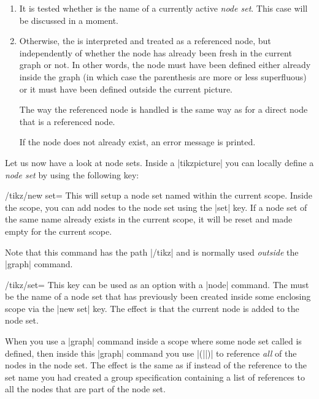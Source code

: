 \begin{enumerate}
\item It is tested whether  is the name of a currently
  active \emph{node set}. This case will be discussed in a moment.
\item Otherwise, the  is interpreted and treated as a
  referenced node, but independently of whether the node has already
  been fresh in the current graph or not. In other words, the node
  must have been defined either already inside the graph (in which
  case the parenthesis are more or less superfluous) or it must have
  been defined outside the current picture.

  The way the referenced node is handled is the same way as for a
  direct node that is a referenced node.

  If the node does not already exist, an error message is printed.
\end{enumerate}

Let us now have a look at node sets. Inside a |{tikzpicture}| you can
locally define a \emph{node set} by using the following key:
\begin{key}{/tikz/new set=}
  This will setup a node set named  within the current
  scope. Inside the scope, you can add nodes to the node set using the
  |set| key. If a node set of the same name already exists in the
  current scope, it will be reset and made empty for the current
  scope.

  Note that this command has the path |/tikz| and is normally used
  \emph{outside} the |graph| command.
\end{key}
\begin{key}{/tikz/set=}
  This key can be used as an option with a |node| command. The
   must be the name of a node set that has previously
  been created inside some enclosing scope via the |new set| key. The
  effect is that the current node is added to the node set.
\end{key}

When you use a |graph| command inside a scope where some node set
called  is defined, then inside this |graph| command
you use |(||)| to reference \emph{all} of the nodes in
the node set. The effect is the same as if instead of the reference to
the set name you had created a group specification containing a list
of references to all the nodes that are part of the node set.

\begin{codeexample}[]
\end{codeexample}

